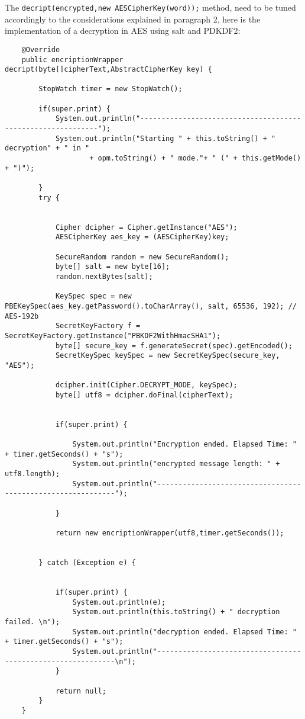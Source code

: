 \documentclass{article}
\begin{document}
The  \verb|decript(encrypted,new AESCipherKey(word));| method, need to be tuned accordingly to the considerations explained in paragraph 2, here is the implementation of a decryption in AES using salt and PDKDF2:

	\begin{verbatim}
	@Override
	public encriptionWrapper decript(byte[]cipherText,AbstractCipherKey key) {

		StopWatch timer = new StopWatch();

		if(super.print) {
			System.out.println("------------------------------------------------------------");
			System.out.println("Starting " + this.toString() + " decryption" + " in " 
					+ opm.toString() + " mode."+ " (" + this.getMode() + ")");
		
		}
		try {

			
			Cipher dcipher = Cipher.getInstance("AES");
			AESCipherKey aes_key = (AESCipherKey)key;
            
			SecureRandom random = new SecureRandom();
			byte[] salt = new byte[16];
			random.nextBytes(salt);

			KeySpec spec = new PBEKeySpec(aes_key.getPassword().toCharArray(), salt, 65536, 192); // AES-192b
			SecretKeyFactory f = SecretKeyFactory.getInstance("PBKDF2WithHmacSHA1");
			byte[] secure_key = f.generateSecret(spec).getEncoded();
			SecretKeySpec keySpec = new SecretKeySpec(secure_key, "AES");

            dcipher.init(Cipher.DECRYPT_MODE, keySpec);
            byte[] utf8 = dcipher.doFinal(cipherText);
            

			if(super.print) {

				System.out.println("Encryption ended. Elapsed Time: " + timer.getSeconds() + "s");
				System.out.println("encrypted message length: " + utf8.length);
				System.out.println("------------------------------------------------------------");

			}

			return new encriptionWrapper(utf8,timer.getSeconds());
			

		} catch (Exception e) {
			
	
			if(super.print) {
				System.out.println(e);
				System.out.println(this.toString() + " decryption failed. \n");
				System.out.println("decryption ended. Elapsed Time: " + timer.getSeconds() + "s");
				System.out.println("------------------------------------------------------------\n");
			}
		
			return null;
		}
	}
	\end{verbatim}
	
\end{document}
